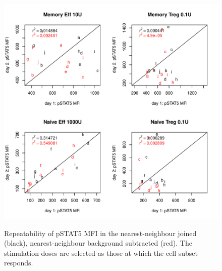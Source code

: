 \begin{figure}
\centering
%
\begin{minipage}{.65\textwidth}
\includegraphics[width=\linewidth]{figures/nn-pstat5-mfi-cellsubsets-repeatability}
\end{minipage}
\begin{minipage}{.3\textwidth}
{ Repeatability of pSTAT5 MFI in the nearest-neighbour joined (black), nearest-neighbour background subtracted (red). }
{
  The stimulation doses are selected as those at which the cell subset responds.
}
\end{minipage}
%
\begin{minipage}{.65\textwidth}

\end{minipage}
\end{figure}
